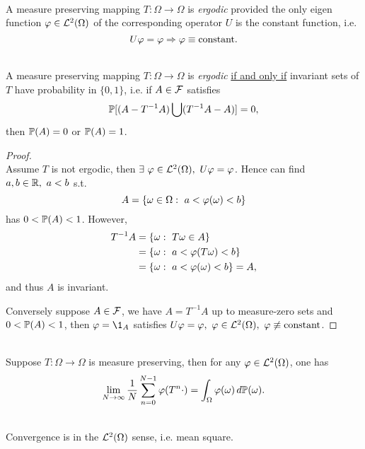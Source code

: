 \vspace{3pt}
\begin{definition}\ \\
A measure preserving mapping $T: \Omega \to \Omega$ is \textit{ergodic} provided the only eigen function $\vphi \in \Ls^2(\Omega)$ of the corresponding operator $U$ is the constant function, i.e.
\begin{equation*}
    U \vphi = \vphi \Rightarrow \vphi \equiv \text{constant}.
\end{equation*}
\end{definition}

\vspace{3pt}
\begin{lemma}\ \\
A measure preserving mapping $T: \Omega \to \Omega$ is \textit{ergodic} \underline{if and only if} invariant sets of $T$ have probability in $\{0,1\}$, i.e. if $A \in \Fs$ satisfies 
\begin{equation*}
    \P[(A - T^{-1} A) \cup (T^{-1} A - A)] = 0, 
\end{equation*}
then $\P(A) = 0$ or $\P(A) = 1$.
\end{lemma}
\begin{proof}\ \\
Assume $T$ is not ergodic, then $\exists\ \vphi \in \Ls^2(\Omega),\ U \vphi = \vphi$. Hence can find $a,b \in \R,\ a < b$ s.t. 
\begin{equation*}
    A = \{\omega \in \Omega:\ a < \vphi(\omega) < b\}
\end{equation*}
has $0 < \P(A) < 1$. However,
\begin{align*}
    T^{-1}A &= \{\omega:\ T \omega \in A\}\\
    &= \{\omega:\ a < \vphi(T \omega) < b\}\\
    &= \{\omega:\ a < \vphi(\omega) < b\} = A,
\end{align*}
and thus $A$ is invariant.

\np Conversely suppose $A \in \Fs$, we have $A = T^{-1}A$ up to measure-zero sets and $0 < \P(A) < 1$, then $\vphi = \1_A$ satisfies $U \vphi = \vphi,\ \vphi \in \Ls^2(\Omega),\ \vphi \not\equiv \text{constant}$.
\end{proof}


\begin{theorem} \label{VN ergodic}\ \\
Suppose $T: \Omega \to \Omega$ is measure preserving, then for any $\vphi \in \Ls^2(\Omega)$, one has 
\begin{equation*}
    \lim_{N \to \infty} \frac{1}{N} \summ{n=0}{N-1} \vphi(T^n \cdot) = \int_\Omega \vphi(\omega) \dr \P(\omega).
\end{equation*}
\end{theorem}
\begin{remark}\ \\
Convergence is in the $\Ls^2(\Omega)$ sense, i.e. mean square.
\end{remark}


